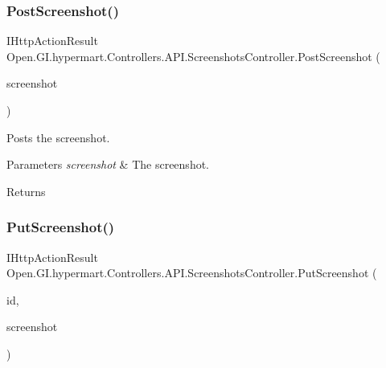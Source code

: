 \subsubsection{\texorpdfstring{Post\+Screenshot()}{PostScreenshot()}}
{\footnotesize\ttfamily I\+Http\+Action\+Result Open.\+G\+I.\+hypermart.\+Controllers.\+A\+P\+I.\+Screenshots\+Controller.\+Post\+Screenshot (\begin{DoxyParamCaption}\item[{\hyperlink{class_open_1_1_g_i_1_1hypermart_1_1_docs_1_1_data_transformation_objects_1_1_screen_shot_d_t_o}{Screen\+Shot\+D\+TO}}]{screenshot }\end{DoxyParamCaption})}



Posts the screenshot. 


\begin{DoxyParams}{Parameters}
{\em screenshot} & The screenshot.\\
\hline
\end{DoxyParams}
\begin{DoxyReturn}{Returns}

\end{DoxyReturn}
\hypertarget{class_open_1_1_g_i_1_1hypermart_1_1_controllers_1_1_a_p_i_1_1_screenshots_controller_a5b53a659a1cf98b2e2866bc9415f69bd}{}\label{class_open_1_1_g_i_1_1hypermart_1_1_controllers_1_1_a_p_i_1_1_screenshots_controller_a5b53a659a1cf98b2e2866bc9415f69bd} 
\subsubsection{\texorpdfstring{Put\+Screenshot()}{PutScreenshot()}}
{\footnotesize\ttfamily I\+Http\+Action\+Result Open.\+G\+I.\+hypermart.\+Controllers.\+A\+P\+I.\+Screenshots\+Controller.\+Put\+Screenshot (\begin{DoxyParamCaption}\item[{int}]{id,  }\item[{\hyperlink{class_open_1_1_g_i_1_1hypermart_1_1_models_1_1_screenshot}{Screenshot}}]{screenshot }\end{DoxyParamCaption})}




